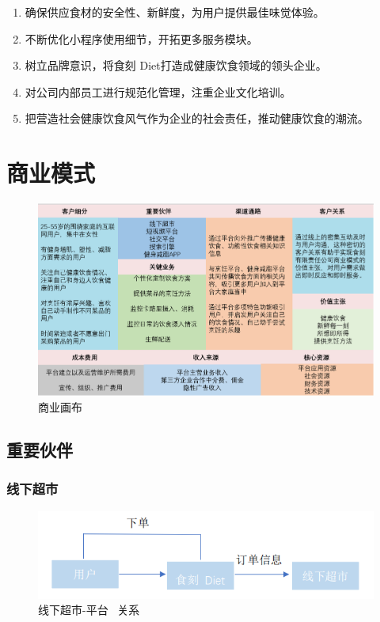\documentclass[UTF8,12pt]{ctexart}
\numberwithin{figure}{section}%
\begin{document}
\begin{spacing}{2}
\begin{enumerate}
	\item[(1)]确保供应食材的安全性、新鲜度，为用户提供最佳味觉体验。
	
	\item[(2)]不断优化小程序使用细节，开拓更多服务模块。
	
	\item[(3)]树立品牌意识，将食刻 Diet打造成健康饮食领域的领头企业。
	
	\item[(4)]对公司内部员工进行规范化管理，注重企业文化培训。
	
	\item[(5)]把营造社会健康饮食风气作为企业的社会责任，推动健康饮食的潮流。
	
\end{enumerate}	

\section{商业模式}

\begin{figure}[H]
	\centering
	\includegraphics[width=13cm]{fig/shangyehuabu}
	\caption{商业画布}
\end{figure}
\subsection{重要伙伴}

\subsubsection{线下超市}

\begin{figure}[!htb]
	\centering
	\includegraphics[width=12cm]{fig/yonghu-chaoshi}
	\caption{线下超市-平台 \ 关系}
\end{figure}


\end{spacing}
\end{document}
